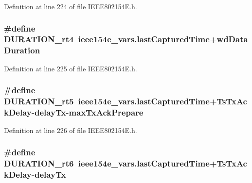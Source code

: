 Definition at line 224 of file I\+E\+E\+E802154\+E.\+h.

\subsubsection[{\texorpdfstring{D\+U\+R\+A\+T\+I\+O\+N\+\_\+rt4}{DURATION_rt4}}]{\setlength{\rightskip}{0pt plus 5cm}\#define D\+U\+R\+A\+T\+I\+O\+N\+\_\+rt4~ieee154e\+\_\+vars.\+last\+Captured\+Time+{\bf wd\+Data\+Duration}}\hypertarget{group___i_e_e_e802154_e_gadb62b6af011681822409e0169f10e659}{}\label{group___i_e_e_e802154_e_gadb62b6af011681822409e0169f10e659}


Definition at line 225 of file I\+E\+E\+E802154\+E.\+h.

\subsubsection[{\texorpdfstring{D\+U\+R\+A\+T\+I\+O\+N\+\_\+rt5}{DURATION_rt5}}]{\setlength{\rightskip}{0pt plus 5cm}\#define D\+U\+R\+A\+T\+I\+O\+N\+\_\+rt5~ieee154e\+\_\+vars.\+last\+Captured\+Time+{\bf Ts\+Tx\+Ack\+Delay}-\/{\bf delay\+Tx}-\/{\bf max\+Tx\+Ack\+Prepare}}\hypertarget{group___i_e_e_e802154_e_ga7d70a4688cb8f913e2545b6d5a1617ce}{}\label{group___i_e_e_e802154_e_ga7d70a4688cb8f913e2545b6d5a1617ce}


Definition at line 226 of file I\+E\+E\+E802154\+E.\+h.

\subsubsection[{\texorpdfstring{D\+U\+R\+A\+T\+I\+O\+N\+\_\+rt6}{DURATION_rt6}}]{\setlength{\rightskip}{0pt plus 5cm}\#define D\+U\+R\+A\+T\+I\+O\+N\+\_\+rt6~ieee154e\+\_\+vars.\+last\+Captured\+Time+{\bf Ts\+Tx\+Ack\+Delay}-\/{\bf delay\+Tx}}\hypertarget{group___i_e_e_e802154_e_gac4b49c57750ff7e8dae6c26f9c8801fd}{}\label{group___i_e_e_e802154_e_gac4b49c57750ff7e8dae6c26f9c8801fd}


